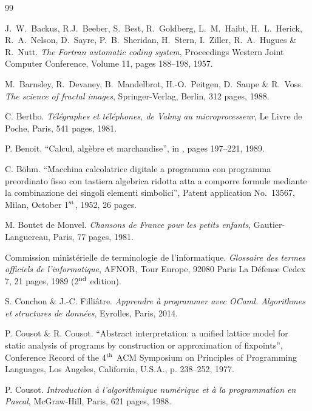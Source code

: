 \begin{thebibliography}{99}

\vfill

 J.~W.~Backus, R.J.~Beeber, S.~Best, R.~Goldberg, 
L.~M.~Haibt, H.~L.~Herick, R.~A.~Nelson, D.~Sayre, P.~B.~Sheridan, H.~Stern,
I.~Ziller, R.~A.~Hugues \& R.~Nutt.
{\em The Fortran automatic coding system}, 
Proceedings Western Joint Computer Conference, Volume 11, 
pages 188--198, 1957.

 M.~Barnsley, R.~Devaney, B.~Mandelbrot,
H.-O.~Peitgen, D.~Saupe \& R.~Voss.
{\em The science of fractal images}, Springer-Verlag, Berlin, 312 pages, 1988.

 C. Bertho.
{\em Télégraphes et téléphones, de Valmy au microprocesseur}, 
Le Livre de Poche, Paris, 541 pages, 1981.

 P. Benoit.
``Calcul, algèbre et marchandise'', \rm in \cite{serres1}, pages 197--221, 1989.

 C. Böhm.
``Macchina calcolatrice digitale a programma con programma preordinato fisso con
tastiera algebrica ridotta atta a comporre formule mediante la
combinazione dei singoli elementi simbolici'', Patent application No.~13567, Milan,
October 1$^{\rm st}$, 1952, 26 pages.

 M. Boutet de Monvel.
{\em Chansons de France pour les petits enfants}, 
Gautier-Languereau, Paris, 77 pages, 1981.

\thispagestyle{empty}

 Commission ministérielle de terminologie de l'informatique.
{\em Glossaire des termes officiels de l'informatique}, AFNOR, Tour Europe, 92080 Paris
La Défense Cedex 7, 21 pages, 1989 (2$^{\rm nd}$ edition).

 S. Conchon \& J.-C. Filliâtre.
{\em Apprendre à programmer avec OCaml. Algorithmes et structures de données}, 
Eyrolles, Paris, 2014.

 P. Cousot \& R. Cousot.
``Abstract interpretation: a unified lattice model for static analysis
of programs by construction or approximation of fixpoints'', Conference
Record of the 4$^{\rm th}$ ACM Symposium on Principles of Programming
Languages, Los Angeles, California, U.S.A., p. 238--252, 1977.

 P. Cousot.
{\em Introduction à l'algorithmique numérique et à la 
programmation en Pascal}, McGraw-Hill, Paris, 621 pages, 1988.


\end{thebibliography}
